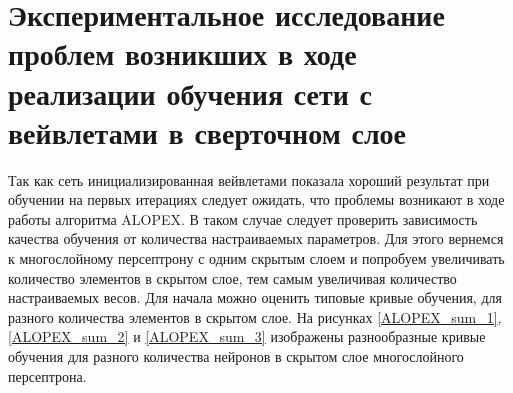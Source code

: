 \documentclass[utf8,usehyperref,14pt]{G7-32}
\begin{document}
\section{Экспериментальное исследование проблем возникших в ходе реализации обучения сети с вейвлетами в сверточном слое}
Так как сеть инициализированная вейвлетами показала хороший результат при обучении на первых итерациях следует ожидать, что проблемы возникают в ходе работы алгоритма ALOPEX. В таком случае следует проверить зависимость качества обучения от количества настраиваемых параметров. Для этого вернемся к многослойному персептрону с одним скрытым слоем и попробуем увеличивать количество элементов в скрытом слое, тем самым увеличивая количество настраиваемых весов.
Для начала можно оценить типовые кривые обучения, для разного количества элементов в скрытом слое. На рисунках \ref{ALOPEX_sum_1}, \ref{ALOPEX_sum_2} и \ref{ALOPEX_sum_3} изображены разнообразные кривые обучения для разного количества нейронов в скрытом слое многослойного персептрона.
\end{document}
